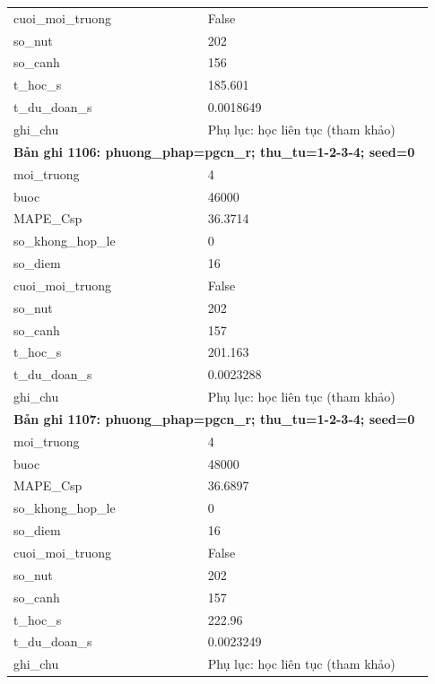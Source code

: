 \begin{longtable}{p{0.43\linewidth}p{0.50\linewidth}}
cuoi\_\allowbreak moi\_\allowbreak truong & False \\
so\_\allowbreak nut & 202 \\
so\_\allowbreak canh & 156 \\
t\_\allowbreak hoc\_\allowbreak s & 185.601 \\
t\_\allowbreak du\_\allowbreak doan\_\allowbreak s & 0.0018649 \\
ghi\_\allowbreak chu & Phụ lục: học liên tục (tham khảo) \\
\midrule
\multicolumn{2}{p{0.95\linewidth}}{\textbf{Bản ghi 1106: phuong\_phap=pgcn\_r; thu\_tu=1-2-3-4; seed=0}} \\
moi\_\allowbreak truong & 4 \\
buoc & 46000 \\
MAPE\_\allowbreak Csp & 36.3714 \\
so\_\allowbreak khong\_\allowbreak hop\_\allowbreak le & 0 \\
so\_\allowbreak diem & 16 \\
cuoi\_\allowbreak moi\_\allowbreak truong & False \\
so\_\allowbreak nut & 202 \\
so\_\allowbreak canh & 157 \\
t\_\allowbreak hoc\_\allowbreak s & 201.163 \\
t\_\allowbreak du\_\allowbreak doan\_\allowbreak s & 0.0023288 \\
ghi\_\allowbreak chu & Phụ lục: học liên tục (tham khảo) \\
\midrule
\multicolumn{2}{p{0.95\linewidth}}{\textbf{Bản ghi 1107: phuong\_phap=pgcn\_r; thu\_tu=1-2-3-4; seed=0}} \\
moi\_\allowbreak truong & 4 \\
buoc & 48000 \\
MAPE\_\allowbreak Csp & 36.6897 \\
so\_\allowbreak khong\_\allowbreak hop\_\allowbreak le & 0 \\
so\_\allowbreak diem & 16 \\
cuoi\_\allowbreak moi\_\allowbreak truong & False \\
so\_\allowbreak nut & 202 \\
so\_\allowbreak canh & 157 \\
t\_\allowbreak hoc\_\allowbreak s & 222.96 \\
t\_\allowbreak du\_\allowbreak doan\_\allowbreak s & 0.0023249 \\
ghi\_\allowbreak chu & Phụ lục: học liên tục (tham khảo) \\

\end{longtable}
